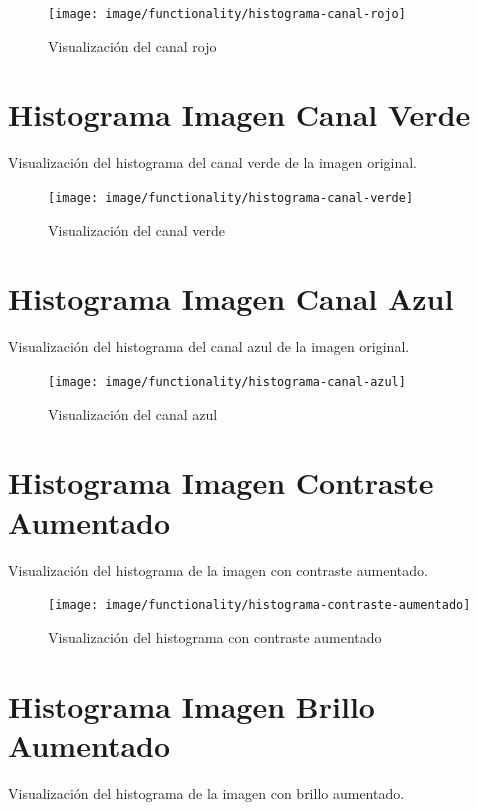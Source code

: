 \documentclass{report}
\begin{document}
  \begin{figure}[H]
    \centering
    \texttt{[image: image/functionality/histograma-canal-rojo]}
    \caption{Visualización del canal rojo}\label{fig:histograma-canal-rojo}
  \end{figure}

  \section{Histograma Imagen Canal Verde}\label{sec:histograma-imagen-canal-verde}
  Visualización del histograma del canal verde de la imagen original.

  \begin{figure}[H]
    \centering
    \texttt{[image: image/functionality/histograma-canal-verde]}
    \caption{Visualización del canal verde}\label{fig:histograma-canal-verde}
  \end{figure}

  \section{Histograma Imagen Canal Azul}\label{sec:histograma-imagen-canal-azul}
  Visualización del histograma del canal azul de la imagen original.

  \begin{figure}[H]
    \centering
    \texttt{[image: image/functionality/histograma-canal-azul]}
    \caption{Visualización del canal azul}\label{fig:histograma-canal-azul}
  \end{figure}

  \section{Histograma Imagen Contraste Aumentado}\label{sec:histograma-imagen-contraste-aumentado}
  Visualización del histograma de la imagen con contraste aumentado.

  \begin{figure}[H]
    \centering
    \texttt{[image: image/functionality/histograma-contraste-aumentado]}
    \caption{Visualización del histograma con contraste aumentado}\label{fig:histograma-contraste-aumentado}
  \end{figure}

  \section{Histograma Imagen Brillo Aumentado}\label{sec:histograma-imagen-brillo-aumentado}
  Visualización del histograma de la imagen con brillo aumentado.
\end{document}
